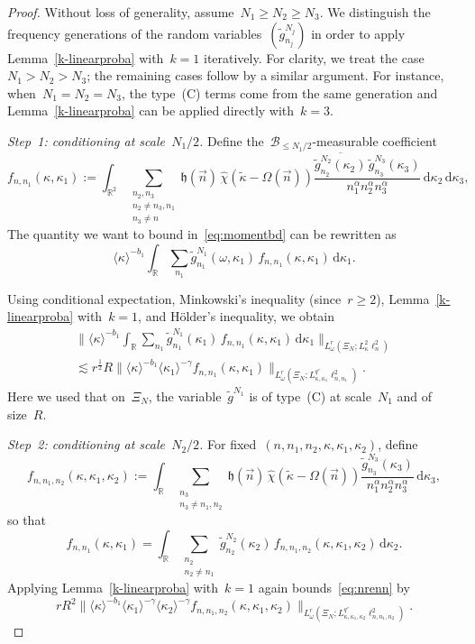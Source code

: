 \documentclass[11pt,reqno,english]{amsart}
\numberwithin{equation}{section}
\theoremstyle{plain}
\theoremstyle{definition}
\theoremstyle{remark}
\newcommand{\R}{\mathbb{R}}
\begin{document}
\begin{proof}
	Without loss of generality, assume~$N_1\geq N_2\geq N_3$.
	We distinguish the frequency generations of the random variables~$(\widetilde g_{n_j}^{N_j})$ in order to apply Lemma~\ref{k-linearproba} with~$k=1$ iteratively.
	For clarity, we treat the case~$N_1>N_2>N_3$; the remaining cases follow by a similar argument. For instance, when~$N_{1}=N_{2}=N_{3}$, the type~(C) terms come from the same generation and Lemma~\ref{k-linearproba} can be applied directly with~$k=3$.

	\emph{Step~1: conditioning at scale~$N_1/2$.}
	Define the~$\mathcal{B}_{\leq N_1/2}$-measurable coefficient
	\[
	f_{n,n_1}(\kappa,\kappa_1)
	:=
	\int_{\R^2}
	\sum_{\substack{n_2,n_3\\ n_2\neq n_3,n_1\\ 
	n_3\neq n}}
	\mathfrak{h}(\vec n)\,
	\widehat{\chi}(\widetilde{\kappa}-\Omega(\vec{n}))
	\frac{
		\overline{\widetilde g_{n_2}^{N_2}(\kappa_2)}\,
		\widetilde g_{n_3}^{N_3}(\kappa_3)
	}{
		n_1^{\alpha}
		n_2^{\alpha}
		n_3^{\alpha}}
	\,\mathrm{d}\kappa_2\,\mathrm{d}\kappa_3,
	\]
	The quantity we want to bound in~\eqref{eq:momentbd} can be rewritten as
	\[
	\langle\kappa\rangle^{-b_1}
	\int_{\R}\sum_{n_1}
	\widetilde g_{n_1}^{N_1}(\omega,\kappa_1)\,
	f_{n,n_1}(\kappa,\kappa_1)\,\mathrm{d}\kappa_1.
	\]

	Using conditional expectation, Minkowski's inequality (since~$r\geq2$),
	Lemma~\ref{k-linearproba} with~$k=1$, and Hölder's inequality, we obtain
	\begin{multline}
		\label{eq:nrenn}
		\Big\|
		\langle\kappa\rangle^{-b_1}
		\int_{\R}\sum_{n_1}
		\widetilde g_{n_1}^{N_1}(\kappa_1)\,
		f_{n,n_1}(\kappa,\kappa_1)\,\mathrm{d}\kappa_1
		\Big\|_{L_\omega^r(\Xi_N;L_\kappa^2\ell_n^2)}
		\\
		\lesssim
		r^{\frac12}R
		\big\|
		\langle\kappa\rangle^{-b_1}\langle\kappa_1\rangle^{-\gamma}
		f_{n,n_1}(\kappa,\kappa_1)
		\big\|_{L_\omega^r(\Xi_N;L_{\kappa,\kappa_1}^{q'}\ell_{n,n_1}^2)}.
	\end{multline}
	Here we used that on~$\Xi_N$, the variable~$\widetilde g^{N_1}$ is of type~(C)
	at scale~$N_1$ and of size~$R$.

	\emph{Step~2: conditioning at scale~$N_2/2$.}
	For fixed~$(n,n_1,n_{2},\kappa,\kappa_1,\kappa_{2})$, define
	\[
	f_{n,n_1,n_2}(\kappa,\kappa_1,\kappa_2)
	:=
	\int_{\R}
	\sum_{\substack{n_3\\ n_3\neq n_1,n_2}}
	\mathfrak{h}(\vec n)\,
	\widehat{\chi}(\widetilde{\kappa}-\Omega(\vec{n}))
	\frac{\widetilde g_{n_3}^{N_3}(\kappa_3)}
	{n_1^{\alpha}n_2^{\alpha}n_3^{\alpha}}
	\,\mathrm{d}\kappa_3,
	\]
	so that
	\[
	f_{n,n_1}(\kappa,\kappa_1)
	=
	\int_{\R}\sum_{\substack{n_{2}\\n_2\neq n_1}}
	\widetilde g_{n_2}^{N_2}(\kappa_2)\,
	f_{n,n_1,n_2}(\kappa,\kappa_1,\kappa_2)\,\mathrm{d}\kappa_2.
	\]
	Applying Lemma~\ref{k-linearproba} with~$k=1$ again bounds~\eqref{eq:nrenn} by
	\[
	rR^2
	\big\|
	\langle\kappa\rangle^{-b_1}
	\langle\kappa_1\rangle^{-\gamma}
	\langle\kappa_2\rangle^{-\gamma}
	f_{n,n_1,n_2}(\kappa,\kappa_{1},\kappa_{2})
	\big\|_{L_\omega^r(\Xi_N;L_{\kappa,\kappa_1,\kappa_2}^{q'}\ell_{n,n_1,n_2}^2)}.
	\]


\end{proof}
\end{document}
